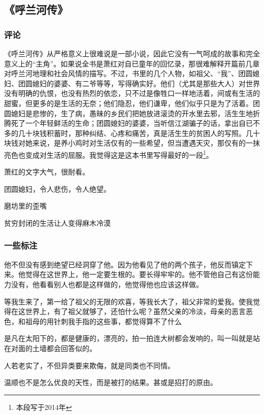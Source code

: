 \subsection{《呼兰河传》}
\subsubsection{评论}

《呼兰河传》从严格意义上很难说是一部小说，因此它没有一气呵成的故事和完全意义上的“主角”。如果说全书是萧红对自已童年的回忆录，那很难解释开篇前几章对呼兰河地理和社会风情的描写。不过，书里的几个人物，如祖父、“我”、团圆媳妇、团圆媳妇的婆婆、有二爷等等，写得确实好。他们（尤其是那些大人）对世界没有明确的仇恨，也没有热烈的依恋，只不过是像牲口一样地活着，间或有生活的甜蜜，但更多的是生活的无奈；他们隐忍，他们谦卑，他们似乎只是为了活着。团圆媳妇是悲惨的，生了病，愚昧的乡民们把她放进滚烫的开水里去邪，活生生地折腾死了一个年轻鲜活的生命；团圆媳妇的婆婆，当听信江湖骗子的话，拿出自已不多的几十块钱积蓄时，那种纠结、心疼和痛苦，真是活生生的贫困人的写照。几十块钱对她来说，是养小鸡时对生活仅有的一些希望，但当遭遇天灾，那仅有的一抹亮色也变成对生活的屈服。我觉得这是这本书里写得最好的一段\footnote{本段写于2014年}。



萧红的文字大气，很耐看。

团圆媳妇，令人悲伤，令人绝望。

磨坊里的歪嘴

贫穷封闭的生活让人变得麻木冷漠

\subsubsection{一些标注}

他不但没有感到绝望已经洞穿了他。因为他看见了他的两个孩子，他反而镇定下来。他觉得在这世界上，他一定要生根的。要长得牢牢的。他不管他自己有这份能力没有，他看看别人也都是这样做的，他觉得他也应该这样做。

等我生来了，第一给了祖父的无限的欢喜，等我长大了，祖父非常的爱我。使我觉得在这世界上，有了祖父就够了，还怕什么呢？虽然父亲的冷淡，母亲的恶言恶色，和祖母的用针刺我手指的这些事，都觉得算不了什么

是凡在太阳下的，都是健康的，漂亮的，拍一拍连大树都会发响的，叫一叫就是站在对面的土墙都会回答似的。

人若老实了，不但异类要来欺侮，就是同类也不同情。

温顺也不是怎么优良的天性，而是被打的结果。甚或是招打的原由。